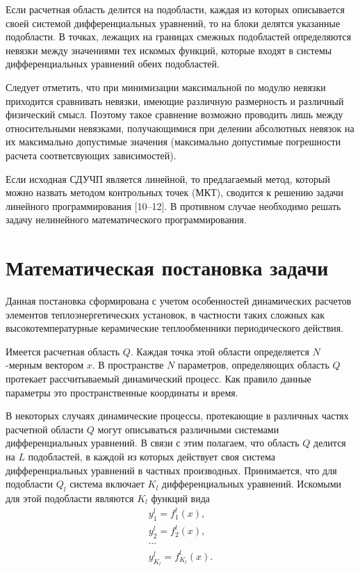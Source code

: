 \documentclass[a4paper,11pt,numreferences,mathsec,kaplist]{isuepsutf8}
\begin{document}
\begin{article}
Если расчетная область делится на подобласти, каждая из которых описывается
своей системой дифференциальных уравнений, то на блоки делятся указанные
подобласти. В точках, лежащих на границах смежных подобластей определяются
невязки между значениями тех искомых функций, которые входят в системы
дифференциальных уравнений обеих подобластей.

Следует отметить, что при минимизации максимальной по модулю невязки
приходится сравнивать невязки, имеющие различную размерность и различный
физический смысл.  Поэтому такое сравнение возможно проводить лишь между
относительными невязками, получающимися при делении абсолютных невязок на
их максимально допустимые значения (максимально допустимые погрешности
расчета соответсвующих зависимостей).

Если исходная СДУЧП является линейной, то предлагаемый метод, который можно
назвать методом контрольных точек (МКТ), сводится к решению задачи
линейного программирования [10--12]. В противном случае необходимо
решать задачу нелинейного математического программирования.

\section{Математическая постановка задачи}

Данная постановка сформирована с учетом особенностей динамических расчетов
элементов теплоэнергетических установок, в частности таких сложных как
высокотемпературные керамические теплообменники периодического действия.

Имеется расчетная область $Q$. Каждая точка этой области определяется
$N$-мерным вектором $x$. В пространстве $N$ параметров, определяющих
область $Q$ протекает рассчитываемый динамический процесс. Как правило
данные параметры это пространственные координаты и время.

В некоторых случаях динамические процессы, протекающие в различных частях
расчетной области $Q$ могут описываться различными системами
дифференциальных уравнений. В связи с этим полагаем, что область $Q$
делится на $L$ подобластей, в каждой из которых действует своя система
дифференциальных уравнений в частных производных. Принимается, что для
подобласти $Q_l$ система включает $K_l$ дифференциальных уравнений.
Искомыми для этой подобласти являются $K_l$ функций вида
\begin{equation} 
    \begin{array}{ll} 
        y^l_1=f^l_1(x), \\ 
        y^l_2=f^l_2(x), \\
        \cdots \\ 
        y^l_{K_l}=f^l_{K_l}(x).  
    \end{array} 
    \label{desir-fnc}
\end{equation}


\end{article}
\end{document}
